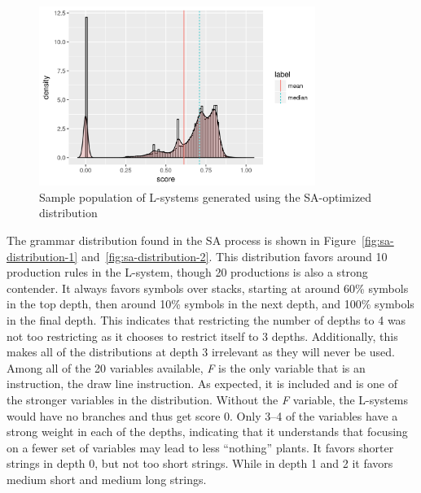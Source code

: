 \begin{figure}
    \centering
    \includegraphics[width=0.8\textwidth]{figures/sa-population}
    \caption{Sample population of L-systems generated using the SA-optimized distribution}
    \label{fig:sa-population}
\end{figure}

The grammar distribution found in the SA process is shown in Figure~\ref{fig:sa-distribution-1} and~\ref{fig:sa-distribution-2}.
This distribution favors around 10 production rules in the L-system, though 20 productions is also a strong contender.
It always favors symbols over stacks, starting at around 60\% symbols in the top depth, then around 10\% symbols in the next depth, and 100\% symbols in the final depth.
This indicates that restricting the number of depths to 4 was not too restricting as it chooses to restrict itself to 3 depths.
Additionally, this makes all of the distributions at depth 3 irrelevant as they will never be used.
Among all of the 20 variables available, \textit{F} is the only variable that is an instruction, the draw line instruction.
As expected, it is included and is one of the stronger variables in the distribution.
Without the \textit{F} variable, the L-systems would have no branches and thus get score 0.
Only 3--4 of the variables have a strong weight in each of the depths, indicating that it understands that focusing on a fewer set of variables may lead to less ``nothing'' plants.
It favors shorter strings in depth 0, but not too short strings.
While in depth 1 and 2 it favors medium short and medium long strings.

